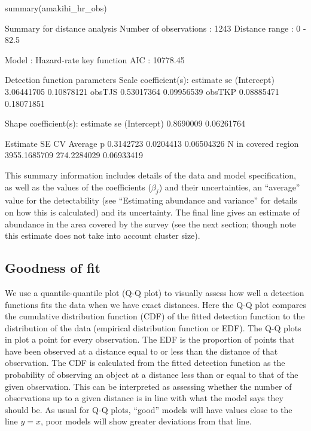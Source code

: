 \documentclass[article]{jss}
\begin{document}
\begin{CodeChunk}
\begin{CodeInput}
summary(amakihi_hr_obs)
\end{CodeInput}
\begin{CodeOutput}

Summary for distance analysis 
Number of observations :  1243 
Distance range         :  0  -  82.5 

Model : Hazard-rate key function 
AIC   : 10778.45 

Detection function parameters
Scale coefficient(s):  
              estimate         se
(Intercept) 3.06441705 0.10878121
obsTJS      0.53017364 0.09956539
obsTKP      0.08885471 0.18071851

Shape coefficient(s):  
             estimate         se
(Intercept) 0.8690009 0.06261764

                        Estimate          SE         CV
Average p              0.3142723   0.0204413 0.06504326
N in covered region 3955.1685709 274.2284029 0.06933419
\end{CodeOutput}
\end{CodeChunk}

This summary information includes details of the data and model
specification, as well as the values of the coefficients (\(\beta_j\))
and their uncertainties, an ``average'' value for the detectability (see
``Estimating abundance and variance'' for details on how this is
calculated) and its uncertainty. The final line gives an estimate of
abundance in the area covered by the survey (see the next section;
though note this estimate does not take into account cluster size).

\subsection{Goodness of fit}\label{goodness-of-fit}

We use a quantile-quantile plot (Q-Q plot) to visually assess how well a
detection functions fits the data when we have exact distances. Here the
Q-Q plot compares the cumulative distribution function (CDF) of the
fitted detection function to the distribution of the data (empirical
distribution function or EDF). The Q-Q plots in  plot a
point for every observation. The EDF is the proportion of points that
have been observed at a distance equal to or less than the distance of
that observation. The CDF is calculated from the fitted detection
function as the probability of observing an object at a distance less
than or equal to that of the given observation. This can be interpreted
as assessing whether the number of observations up to a given distance
is in line with what the model says they should be. As usual for Q-Q
plots, ``good'' models will have values close to the line \(y=x\), poor
models will show greater deviations from that line.
\end{document}
